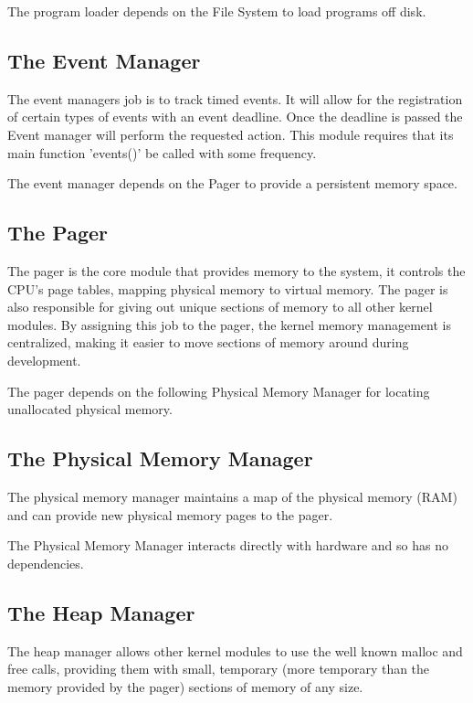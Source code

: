 \documentclass[a4paper]{report}
\begin{document}
The program loader depends on the File System to load programs off disk.

\subsection{The Event Manager}

The event managers job is to track timed events. It will allow for the registration of certain types of events with an event deadline. Once the deadline is passed the Event manager will perform the requested action. This module requires that its main function 'events()' be called with some frequency.

The event manager depends on the Pager to provide a persistent memory space.

\subsection{The Pager}

The pager is the core module that provides memory to the system, it controls the CPU's page tables, mapping physical memory to virtual memory. The pager is also responsible for giving out unique sections of memory to all other kernel modules. By assigning this job to the pager, the kernel memory management is centralized, making it easier to move sections of memory around during development.

The pager depends on the following Physical Memory Manager for locating unallocated physical memory.

\subsection{The Physical Memory Manager}

The physical memory manager maintains a map of the physical memory (RAM) and can provide new physical memory pages to the pager.

The Physical Memory Manager interacts directly with hardware and so has no dependencies.

\subsection{The Heap Manager}

The heap manager allows other kernel modules to use the well known malloc and free calls, providing them with small, temporary (more temporary than the memory provided by the pager) sections of memory of any size.
\end{document}
